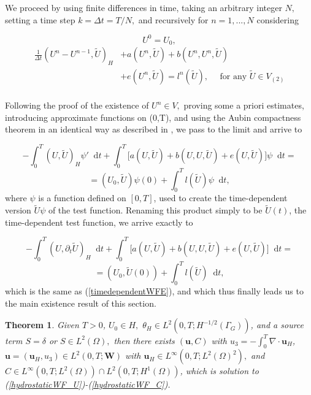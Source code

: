 \documentclass[11pt]{article}
\newtheorem{theorem}{Theorem}
\newcommand*\diff{\mathop{}\!\mathrm{d}}
\begin{document}
We proceed by using finite differences in time, taking an arbitrary integer $N,$ setting a time step $k = \Delta t = T/N,$ and recursively for $n = 1, ... , N$ considering

\[ U^0 = U_0,\]
\begin{equation}
\begin{split}
\frac{1}{\Delta t} (U^n - U^{n-1}, \tilde{U})_H & + a(U^n, \tilde{U}) + b(U^n,U^n, \tilde{U})\\
& + e(U^n, \tilde{U}) = l^n(\tilde{U}), \quad \text{ for any } \tilde{U} \in V_{(2)} \\
\end{split}
\end{equation}

Following the proof of the existence of $U^n \in V,$ proving some a priori estimates, introducing approximate functions on (0,T), and using the Aubin compactness theorem in an identical way as described in \cite{temam2005some}, we pass to the limit and arrive to

\[ - \int_0^T (U, \tilde{U})_H \psi ' \diff t + \int_0^T \big [ a(U, \tilde{U}) + b(U,U, \tilde{U}) + e(U, \tilde{U}) \big ] \psi \diff t = \]
\[ = (U_0, \tilde{U}) \psi (0) + \int_0 ^ T l(\tilde{U}) \psi \diff t, \]
%
where $\psi$ is a function defined on $[0,T]$, used to create the time-dependent version $\tilde{U}\psi$ of the test function. Renaming this product simply to be $\tilde{U}(t)$, the time-dependent test function, we arrive exactly to

\[ - \int_0^T (U, \partial_t \tilde{U})_H \diff t + \int_0^T \big [ a(U, \tilde{U}) + b(U,U, \tilde{U}) + e(U, \tilde{U}) \big ] \diff t = \]
\[ = (U_0, \tilde{U}(0)) + \int_0 ^ T l(\tilde{U}) \diff t, \]
%
which is the same as (\ref{timedependentWFE}), and which thus finally leads us to the main existence result of this section.

\begin{theorem}

Given $T > 0$, $U_0 \in H,$ $\theta_H \in L^2(0,T; H^{-1/2}(\Gamma_G))$, and a source term $S = \delta$ or $S \in L^2(\Omega),$ then there exists $(\mathbf{u}, C)$ with $u_3 = - \int_0^T \nabla \cdot \mathbf{u}_H$, $\mathbf{u} = (\mathbf{u}_H, u_3) \in L^2 (0, T; \mathbf{W})$ with $\mathbf{u}_H \in L^\infty (0,T; L^2(\Omega)^2),$ and $C \in L^\infty (0,T; L^2 (\Omega)) \cap L^2( 0,T; H^1(\Omega))$, which is solution to (\ref{hydrostaticWF_U})-(\ref{hydrostaticWF_C}).

\end{theorem}
\end{document}
